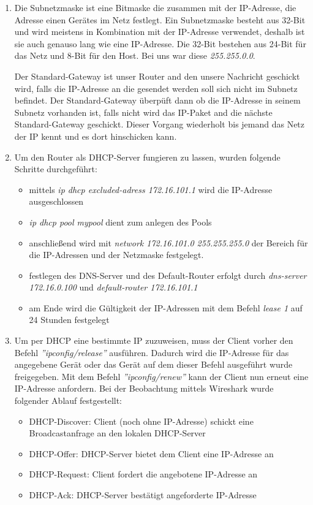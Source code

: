 \documentclass{scrartcl}
\begin{document}
   \renewcommand{\labelenumi}{\alph{enumi})}
   \begin{enumerate}
   \item
   Die Subnetzmaske ist eine Bitmaske die zusammen mit der IP-Adresse, die Adresse einen Gerätes im Netz festlegt. Ein Subnetzmaske besteht aus 32-Bit und wird meistens in Kombination mit der IP-Adresse verwendet, deshalb ist sie auch genauso lang wie eine IP-Adresse. Die 32-Bit bestehen aus 24-Bit für das Netz und 8-Bit für den Host. Bei uns war diese \textit{255.255.0.0}.
   
   Der Standard-Gateway ist unser Router and den unsere Nachricht geschickt wird, falls die IP-Adresse an die gesendet werden soll sich nicht im Subnetz befindet. Der Standard-Gateway überpüft dann ob die IP-Adresse in seinem Subnetz vorhanden ist, falls nicht wird das IP-Paket and die nächste Standard-Gateway geschickt. Dieser Vorgang wiederholt bis jemand das Netz der IP kennt und es dort hinschicken kann.

   \item
   Um den Router als DHCP-Server fungieren zu lassen, wurden folgende Schritte durchgeführt:
	 \begin{itemize}
     \item mittels \textit{ip dhcp excluded-adress 172.16.101.1} wird die IP-Adresse ausgeschlossen 
     \item \textit{ip dhcp pool mypool} dient zum anlegen des Pools
     \item anschließend wird mit \textit{network 172.16.101.0 255.255.255.0} der Bereich für die IP-Adressen und der Netzmaske festgelegt.
     \item festlegen des DNS-Server und des Default-Router erfolgt durch \textit{dns-server 172.16.0.100} und \textit{default-router 172.16.101.1}
     \item am Ende wird die Gültigkeit der IP-Adressen mit dem Befehl \textit{lease 1} auf 24 Stunden festgelegt
     \end{itemize}
	
   \item
   Um per DHCP eine bestimmte IP zuzuweisen, muss der Client vorher den Befehl \textit{''ipconfig/release''} ausführen. Dadurch wird die IP-Adresse für das angegebene Gerät oder das Gerät auf dem dieser Befehl ausgeführt wurde freigegeben. Mit dem Befehl \textit{''ipconfig/renew''} kann der Client nun erneut eine IP-Adresse anfordern.
Bei der Beobachtung mittels Wireshark wurde folgender Ablauf festgestellt:
\begin{itemize}
\item DHCP-Discover: Client (noch ohne IP-Adresse) schickt eine Broadcastanfrage an den lokalen DHCP-Server
\item DHCP-Offer: DHCP-Server bietet dem Client eine IP-Adresse an
\item DHCP-Request: Client fordert die angebotene IP-Adresse an
\item DHCP-Ack: DHCP-Server bestätigt angeforderte IP-Adresse
\end{itemize}
   

\end{enumerate}
\end{document}
